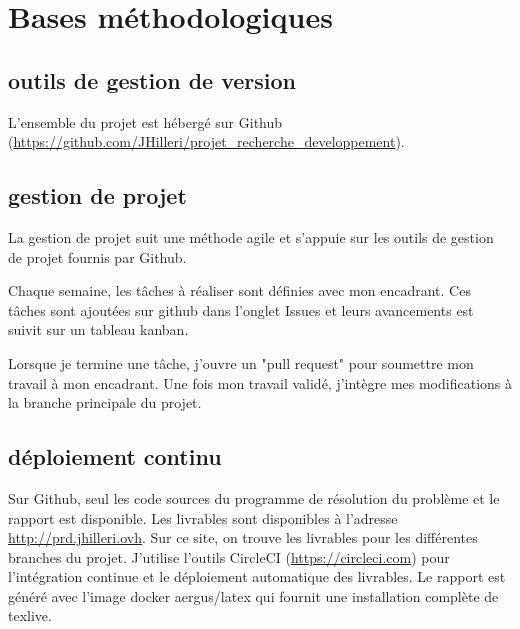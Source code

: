 \section{Bases méthodologiques}
\subsection{outils de gestion de version}
L'ensemble du projet est hébergé sur Github (\url{https://github.com/JHilleri/projet_recherche_developpement}).

\subsection{gestion de projet}
La gestion de projet suit une méthode agile et s'appuie sur les outils de gestion de projet fournis par Github.

Chaque semaine, les tâches à réaliser sont définies avec mon encadrant.
Ces tâches sont ajoutées sur github dans l'onglet Issues et leurs avancements est suivit sur un tableau kanban.

Lorsque je termine une tâche, j'ouvre un "pull request" pour soumettre mon travail à mon encadrant.
Une fois mon travail validé, j'intègre mes modifications à la branche principale du projet.

\subsection{déploiement continu}
Sur Github, seul les code sources du programme de résolution du problème et le rapport est disponible.
Les livrables sont disponibles à l'adresse \url{http://prd.jhilleri.ovh}.
Sur ce site, on trouve les livrables pour les différentes branches du projet.
J'utilise l'outils CircleCI (\url{https://circleci.com}) pour l'intégration continue 
    et le déploiement automatique des livrables.
Le rapport est généré avec l'image docker aergus/latex qui fournit une installation complète de texlive.
